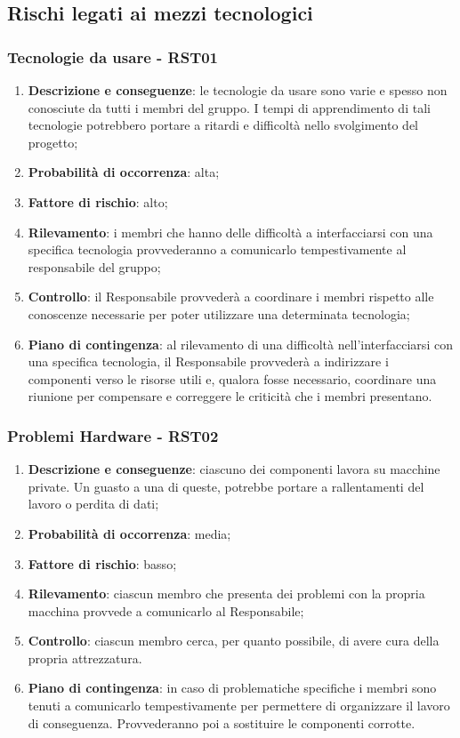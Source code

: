 \subsection{Rischi legati ai mezzi tecnologici}
	\subsubsection{Tecnologie da usare - RST01}		
	\begin{enumerate}
		\item \textbf{Descrizione e conseguenze}: le tecnologie da usare sono varie e spesso non conosciute da tutti i membri del gruppo. I tempi di apprendimento di tali tecnologie potrebbero portare a ritardi e difficoltà nello svolgimento del progetto;
		\item \textbf{Probabilità di occorrenza}: alta;
		\item \textbf{Fattore di rischio}: alto;
		\item \textbf{Rilevamento}: i membri che hanno delle difficoltà a interfacciarsi con una specifica tecnologia provvederanno a comunicarlo tempestivamente al responsabile del gruppo;
		\item \textbf{Controllo}: il Responsabile provvederà a coordinare i membri rispetto alle conoscenze necessarie per poter utilizzare una determinata tecnologia;  
		\item \textbf{Piano di contingenza}: al rilevamento di una difficoltà nell'interfacciarsi con una specifica tecnologia, il Responsabile provvederà a indirizzare i componenti verso le risorse utili e, qualora fosse necessario, coordinare una riunione per compensare e correggere le criticità che i membri presentano.
	\end{enumerate}	
	
	\subsubsection{Problemi Hardware - RST02}
	\begin{enumerate}
		\item \textbf{Descrizione e conseguenze}: ciascuno dei componenti lavora su macchine private. Un guasto a una di queste, potrebbe portare a rallentamenti del lavoro o perdita di dati;
		\item \textbf{Probabilità di occorrenza}: media;
		\item \textbf{Fattore di rischio}: basso;
		\item \textbf{Rilevamento}: ciascun membro che presenta dei problemi con la propria macchina provvede a comunicarlo al Responsabile;		
		\item \textbf{Controllo}: ciascun membro cerca, per quanto possibile, di avere cura della propria attrezzatura.
		\item \textbf{Piano di contingenza}: in caso di problematiche specifiche i membri sono tenuti a comunicarlo tempestivamente per permettere di organizzare il lavoro di conseguenza. Provvederanno poi a sostituire le componenti corrotte. 
	\end{enumerate}
	
